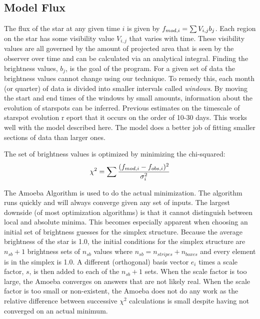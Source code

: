 

\subsection{Model Flux \label{flux}}
The flux of the star at any given time $i$ is given by $\mbox{$f_{mod,i}$} = \sum{V_{i,j} b_{j}}$. Each region on the star has some visibility value $V_{i,j}$ that varies with time. These visibility values are all governed by the amount of projected area that is seen by the observer over time and can be calculated via an analytical integral. Finding the brightness values, $b_j$, is the goal of the program. For a given set of data the brightness values cannot change using our technique. To remedy this, each month (or quarter) of data is divided into smaller intervals called {\it windows}. By moving the start and end times of the windows by small amounts, information about the evolution of starspots can be inferred. Previous estimates on the timescale of starspot evolution r eport that it occurs on the order of 10-30 days. This works well with the model described here. The model does a better job of fitting smaller sections of data than larger ones.

The set of brightness values is optimized by minimizing the chi-squared:
\begin{equation}
	\chi^2 = \sum \frac{(\mbox{$f_{mod,i}$} - \mbox{$f_{obs,i}$})^2}{\sigma_i^2}
\end{equation}

The Amoeba Algorithm is used to do the actual minimization. The algorithm runs quickly and will always converge given any set of inputs. The largest downside (of most optimization algorithms) is that it cannot distinguish between local and absolute minima. This becomes especially apparent when choosing an initial set of brightness guesses for the simplex structure. Because the average brightness of the star is 1.0, the initial conditions for the simplex structure are $n_{sb} + 1$ brightness sets of $n_{sb}$ values where $n_{sb} = n_{stripes} + n_{boxes}$ and every element is in the simplex is 1.0. A different (orthogonal) basis vector $e_i$ times a scale factor, $s$, is then added to each of the $n_{sb} + 1$ sets. When the scale factor is too large, the Amoeba converges on answers that are not likely real. When the scale factor is too small or non-existent, the Amoeba does not do any work as the relative difference between successive $\chi^2$ calculations is small despite having not converged on an actual minimum.
